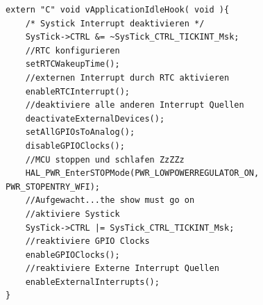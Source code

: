 \begin{lstlisting}[caption={Pseudocode für eine Idle Hook Funktion},captionpos=b, label=lst:xIdleHookExamp, float=hbt!]
extern "C" void vApplicationIdleHook( void ){
	/* Systick Interrupt deaktivieren */
	SysTick->CTRL &= ~SysTick_CTRL_TICKINT_Msk;
	//RTC konfigurieren
	setRTCWakeupTime();
	//externen Interrupt durch RTC aktivieren
	enableRTCInterrupt();
	//deaktiviere alle anderen Interrupt Quellen
	deactivateExternalDevices();
	setAllGPIOsToAnalog(); 
	disableGPIOClocks();
	//MCU stoppen und schlafen ZzZZz
	HAL_PWR_EnterSTOPMode(PWR_LOWPOWERREGULATOR_ON, PWR_STOPENTRY_WFI); 
	//Aufgewacht...the show must go on
	//aktiviere Systick
	SysTick->CTRL |= SysTick_CTRL_TICKINT_Msk;
	//reaktiviere GPIO Clocks
	enableGPIOClocks();
	//reaktiviere Externe Interrupt Quellen
	enableExternalInterrupts();	
}
\end{lstlisting}